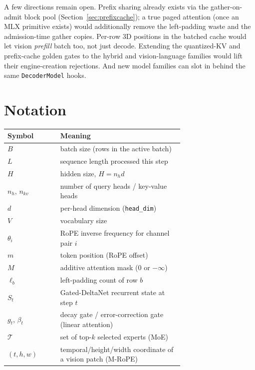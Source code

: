 \documentclass[11pt,a4paper]{report}
\newcommand{\code}[1]{\texttt{#1}}
\begin{document}
A few directions remain open. Prefix sharing already exists via the
gather-on-admit block pool (Section~\ref{sec:prefixcache}); a true paged
attention (once an MLX primitive exists) would additionally remove the
left-padding waste and the admission-time gather copies. Per-row 3D positions in
the batched cache would let vision \emph{prefill} batch too, not just decode.
Extending the quantized-KV and prefix-cache golden gates to the hybrid and
vision-language families would lift their engine-creation rejections. And new
model families can slot in behind the same \code{DecoderModel} hooks.

\appendix
\chapter{Notation}
\label{app:notation}

\begin{longtable}{@{}l p{0.7\linewidth}@{}}
\toprule
Symbol & Meaning \\
\midrule
\endhead
$B$ & batch size (rows in the active batch) \\
$L$ & sequence length processed this step \\
$H$ & hidden size, $H = n_h d$ \\
$n_h$, $n_{kv}$ & number of query heads / key-value heads \\
$d$ & per-head dimension (\code{head\_dim}) \\
$V$ & vocabulary size \\
$\theta_i$ & RoPE inverse frequency for channel pair $i$ \\
$m$ & token position (RoPE offset) \\
$M$ & additive attention mask ($0$ or $-\infty$) \\
$\ell_b$ & left-padding count of row $b$ \\
$S_t$ & Gated-DeltaNet recurrent state at step $t$ \\
$g_t$, $\beta_t$ & decay gate / error-correction gate (linear attention) \\
$\mathcal{T}$ & set of top-$k$ selected experts (MoE) \\
$(t,h,w)$ & temporal/height/width coordinate of a vision patch (M-RoPE) \\
\bottomrule
\end{longtable}
\end{document}
